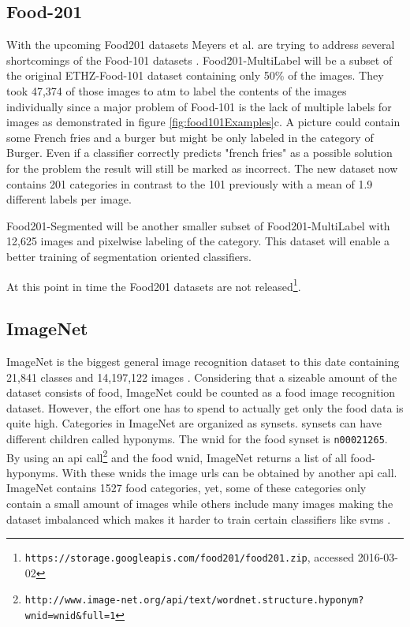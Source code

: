 \subsection{Food-201}
\label{subsec:relWork_Datasets_food201}
With the upcoming Food201 datasets Meyers et al. are trying to address several shortcomings of the Food-101 datasets \cite{Meyers2015}. Food201-MultiLabel will be a subset of the original ETHZ-Food-101 dataset containing only 50\% of the images. They took 47,374 of those images to \gls{atm} to label the contents of the images individually since a major problem of Food-101 is the lack of multiple labels for images as demonstrated in figure \ref{fig:food101Examples}c. A picture could contain some French fries and a burger but might be only labeled in the category of Burger. Even if a classifier correctly predicts "french fries" as a possible solution for the problem the result will still be marked as incorrect. The new dataset now contains 201 categories in contrast to the 101 previously with a mean of 1.9 different labels per image.

Food201-Segmented will be another smaller subset of Food201-MultiLabel with 12,625 images and pixelwise labeling of the category. This dataset will enable a better training of segmentation oriented classifiers.

At this point in time the Food201 datasets are not released\footnote{\texttt{https://storage.googleapis.com/food201/food201.zip}, accessed 2016-03-02}.

\subsection{ImageNet}
\label{subsec:relWork_Datasets_imgNet}
ImageNet is the biggest general image recognition dataset to this date containing 21,841 classes and 14,197,122 images \cite{Russakovsky2015}. Considering that a sizeable amount of the dataset consists of food, ImageNet could be counted as a food image recognition dataset. However, the effort one has to spend to actually get only the food data is quite high. Categories in ImageNet are organized as \glspl{synset}. \Glspl{synset} can have different children called hyponyms. The \gls{wnid} for the food \gls{synset} is \texttt{n00021265}. By using an \gls{api} call\footnote{\texttt{http://www.image-net.org/api/text/wordnet.structure.hyponym?wnid=wnid\&full=1}} and the food \gls{wnid}, ImageNet returns a list of all food-\glspl{hyponym}. With these \glspl{wnid} the image \glspl{url} can be obtained by another \gls{api} call. ImageNet contains 1527 food categories, yet, some of these categories only contain a small amount of images while others include many images making the dataset imbalanced which makes it harder to train certain classifiers like \glspl{svm} \cite{Batuwita2013}.

